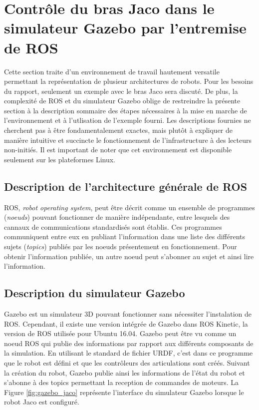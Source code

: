 \documentclass[root.tex]{subfiles}
\begin{document}
\section{Contrôle du bras Jaco dans le simulateur Gazebo par l'entremise de ROS}

Cette section traite d'un environnement de travail hautement versatile permettant la représentation de plusieur architectures de robots.
Pour les besoins du rapport, seulement un exemple avec le bras Jaco sera discuté.
De plus, la complexité de ROS et du simulateur Gazebo oblige de restreindre la présente section à la description sommaire des étapes nécessaires à la mise en marche de l'environnement et à l'utlisation de l'exemple fourni.
Les descriptions fournies ne cherchent pas à être fondamentalement exactes, mais plutôt à expliquer de manière intuitive et succincte le fonctionnement de l'infrastructure à des lecteurs non-initiés.
Il est important de noter que cet environnement est disponible seulement sur les plateformes Linux.

\subsection{Description de l'architecture générale de ROS}

ROS, \textit{robot operating system}, peut être décrit comme un ensemble de programmes (\textit{noeuds}) pouvant fonctionner de manière indépendante, entre lesquels des cannaux de communications standardisés sont établis.
Ces programmes communiquent entre eux en publiant l'information dans une liste des différents sujets (\textit{topics}) publiés par les noeuds présentement en fonctionnement.
Pour obtenir l'information publiée, un autre noeud peut s'abonner au sujet et ainsi lire l'information.

\subsection{Description du simulateur Gazebo}

Gazebo est un simulateur 3D pouvant fonctionner sans nécessiter l'instalation de ROS.
Cependant, il existe une version intégrée de Gazebo dans ROS Kinetic, la version de ROS utilisée pour Ubuntu 16.04.
Gazebo peut être vu comme un noeud ROS qui publie des informations par rapport aux différents composants de la simulation.
En utilisant le standard de fichier URDF, c'est dans ce programme que le robot est défini et que les contrôleurs des articulations sont créés.
Suivant la création du robot, Gazebo publie ainsi les informations de l'état du robot et s'abonne à des topics permettant la reception de commandes de moteurs.
La Figure \ref{fig:gazebo_jaco} représente l'interface du simulateur Gazebo lorsque le robot Jaco est configuré.
\end{document}

